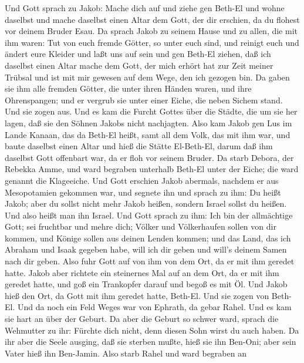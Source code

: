  Und Gott sprach zu Jakob: Mache dich auf und ziehe gen
Beth-El und wohne daselbst und mache daselbst einen Altar dem Gott, der
dir erschien, da du flohest vor deinem Bruder Esau.  Da
sprach Jakob zu seinem Hause und zu allen, die mit ihm waren: Tut von
euch fremde Götter, so unter euch sind, und reinigt euch und ändert eure
Kleider  und laßt uns auf sein und gen Beth-El ziehen, daß
ich daselbst einen Altar mache dem Gott, der mich erhört hat zur Zeit
meiner Trübsal und ist mit mir gewesen auf dem Wege, den ich gezogen
bin.  Da gaben sie ihm alle fremden Götter, die unter ihren
Händen waren, und ihre Ohrenspangen; und er vergrub sie unter einer
Eiche, die neben Sichem stand.  Und sie zogen aus. Und es
kam die Furcht Gottes über die Städte, die um sie her lagen, daß sie den
Söhnen Jakobs nicht nachjagten.  Also kam Jakob gen Lus im
Lande Kanaan, das da Beth-El heißt, samt all dem Volk, das mit ihm war,
 und baute daselbst einen Altar und hieß die Stätte
El-Beth-El, darum daß ihm daselbst Gott offenbart war, da er floh vor
seinem Bruder.  Da starb Debora, der Rebekka Amme, und ward
begraben unterhalb Beth-El unter der Eiche; die ward genannt die
Klageeiche.  Und Gott erschien Jakob abermals, nachdem er
aus Mesopotamien gekommen war, und segnete ihn  und sprach
zu ihm: Du heißt Jakob; aber du sollst nicht mehr Jakob heißen, sondern
Israel sollst du heißen. Und also heißt man ihn Israel. 
Und Gott sprach zu ihm: Ich bin der allmächtige Gott; sei fruchtbar und
mehre dich; Völker und Völkerhaufen sollen von dir kommen, und Könige
sollen aus deinen Lenden kommen;  und das Land, das ich
Abraham und Isaak gegeben habe, will ich dir geben und will's deinem
Samen nach dir geben.  Also fuhr Gott auf von ihm von dem
Ort, da er mit ihm geredet hatte.  Jakob aber richtete ein
steinernes Mal auf an dem Ort, da er mit ihm geredet hatte, und goß ein
Trankopfer darauf und begoß es mit Öl.  Und Jakob hieß den
Ort, da Gott mit ihm geredet hatte, Beth-El.  Und sie zogen
von Beth-El. Und da noch ein Feld Weges war von Ephrath, da gebar Rahel.
 Und es kam sie hart an über der Geburt. Da aber die Geburt
so schwer ward, sprach die Wehmutter zu ihr: Fürchte dich nicht, denn
diesen Sohn wirst du auch haben.  Da ihr aber die Seele
ausging, daß sie sterben mußte, hieß sie ihn Ben-Oni; aber sein Vater
hieß ihn Ben-Jamin.  Also starb Rahel und ward begraben an
